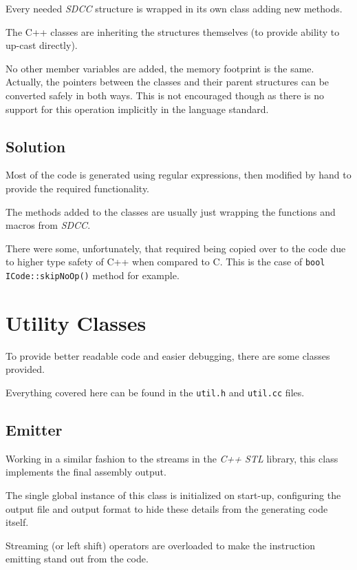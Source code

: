         Every needed \emph{SDCC} structure is wrapped in its own class adding new methods.

        The C++ classes are inheriting the structures themselves (to provide ability to up-cast directly).

        No other member variables are added, the memory footprint is the same. Actually, the pointers between the classes and their parent structures can be converted safely in both ways. This is not encouraged though as there is no support for this operation implicitly in the language standard.

        \subsection{Solution}

        Most of the code is generated using regular expressions, then modified by hand to provide the required functionality.

        The methods added to the classes are usually just wrapping the functions and macros from \emph{SDCC}.

        There were some, unfortunately, that required being copied over to the code due to higher type safety of C++ when compared to C. This is the case of \texttt{bool ICode::skipNoOp()} method for example.

    \section{Utility Classes}

    To provide better readable code and easier debugging, there are some classes provided.

    Everything covered here can be found in the \texttt{util.h} and \texttt{util.cc} files.

        \subsection{Emitter}\label{emitter}

        Working in a similar fashion to the streams in the \emph{C++ STL} library, this class implements the final assembly output.

        The single global instance of this class is initialized on start-up, configuring the output file and output format to hide these details from the generating code itself.

        Streaming (or left shift) operators are overloaded to make the instruction emitting stand out from the code.


